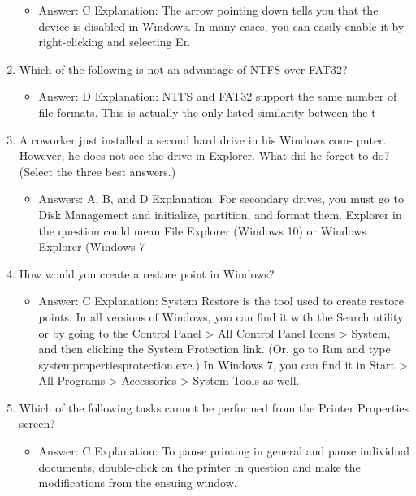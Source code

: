 \documentclass{article}
\begin{document}
\begin{enumerate}
\begin{itemize}
         \item Answer:   C                Explanation:        The arrow pointing down tells you that the device is disabled in Windows. In many cases, you can easily enable it by right-clicking and selecting En
     \end{itemize}
     \item Which of the following is not an advantage of NTFS over FAT32?
     \begin{itemize}
         \item Answer:   D                Explanation:        NTFS and FAT32 support the same number of file formats. This is actually the only listed similarity between the t
     \end{itemize}
     \item A coworker just installed a second hard drive in his Windows com-
puter. However, he does not see the drive in Explorer. What did he
forget to do? (Select the three best answers.)
     \begin{itemize}
         \item  Answers: A, B, and D                Explanation:        For secondary drives, you must go to Disk Management and initialize, partition, and format them. Explorer in the question could mean File Explorer (Windows 10) or Windows Explorer (Windows 7
     \end{itemize}
     \item How would you create a restore point in Windows?
     \begin{itemize}
         \item Answer:   C                Explanation:        System Restore is the tool used to create restore points. In all versions of Windows, you can find it with the Search utility or by going to the Control Panel > All Control Panel Icons > System, and then clicking the System Protection link. (Or, go to Run and type systempropertiesprotection.exe.) In Windows 7, you can find it in Start > All Programs > Accessories > System Tools as well.
     \end{itemize}
     \item Which of the following tasks cannot be performed from the Printer
Properties screen?
     \begin{itemize}
         \item   Answer:   C                Explanation:        To pause printing in general and pause individual documents, double-click on the printer in question and make the modifications from the ensuing window.
     \end{itemize}

\end{enumerate}
\end{document}
